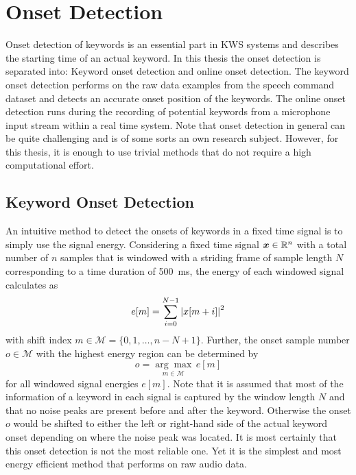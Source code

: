 
\section{Onset Detection}\label{sec:signal_onset}
Onset detection of keywords is an essential part in KWS systems and describes the starting time of an actual keyword.
In this thesis the onset detection is separated into: Keyword onset detection and online onset detection.
The keyword onset detection performs on the raw data examples from the speech command dataset and detects an accurate onset position of the keywords.
The online onset detection runs during the recording of potential keywords from a microphone input stream within a real time system.
Note that onset detection in general can be quite challenging and is of some sorts an own research subject.
However, for this thesis, it is enough to use trivial methods that do not require a high computational effort.



\subsection{Keyword Onset Detection}\label{sec:signal_onset_kw}
An intuitive method to detect the onsets of keywords in a fixed time signal is to simply use the signal energy.
Considering a fixed time signal $\bm{x} \in \mathbb{R}^n$ with a total number of $n$ samples that is windowed with a striding frame of sample length $N$ corresponding to a time duration of \SI{500}{\milli\second}, the energy of each windowed signal calculates as
\begin{equation}\label{eq:e_win}
  e[m] = \sum_{i=0}^{N-1} \abs{x[m + i]}^2
\end{equation}
with shift index $m \in \mathcal{M} = \{0, 1, \dots, n - N + 1\}$.
Further, the onset sample number $o \in \mathcal{M}$ with the highest energy region can be determined by
\begin{equation}\label{eq:onset}
  o = \underset{m \in \mathcal{M}}{\arg \max} \, e[m]
\end{equation}
for all windowed signal energies $e[m]$.
Note that it is assumed that most of the information of a keyword in each signal is captured by the window length $N$ and that no noise peaks are present before and after the keyword. 
Otherwise the onset $o$ would be shifted to either the left or right-hand side of the actual keyword onset depending on where the noise peak was located.
It is most certainly that this onset detection is not the most reliable one. 
Yet it is the simplest and most energy efficient method that performs on raw audio data.

